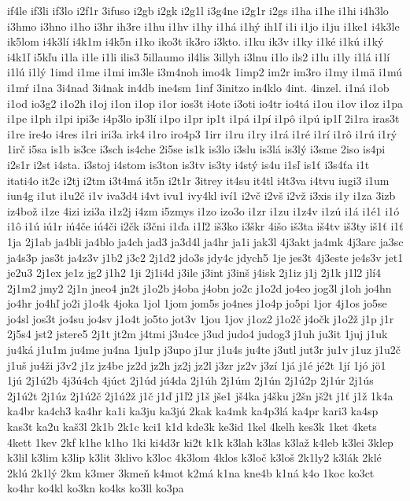 {if4le
if3li
if3lo
i2f1r
3ifuso
i2gb
i2gk
i2g1l
i3g4ne
i2g1r
i2gs
i1ha
i1he
i1hi
i4h3lo
i3hmo
i3hno
i1ho
i3hr
ih3re
i1hu
i1hv
i1hy
i1há
i1hý
ih1ľ
i1i
i1jo
i1ju
i1ke1
i4k3le
ik5lom
i4k3lí
i4k1m
i4k5n
i1ko
iko3t
ik3ro
i3kto.
i1ku
ik3v
i1ky
i1ké
i1kú
i1ký
i4k1ľ
i5kľu
i1la
i1le
i1li
ilis3
5illaumo
il4lis
3illyh
i3lnu
i1lo
ils2
i1lu
i1ly
i1lá
i1lí
i1lú
i1lý
1imd
i1me
i1mi
im3le
i3m4noh
imo4k
1imp2
im2r
im3ro
i1my
i1mä
i1mú
i1mŕ
i1na
3i4nad
3i4nak
in4db
ine4sm
1inf
3initzo
in4klo
4int.
4inzel.
i1ná
i1ob
i1od
io3g2
i1o2h
i1oj
i1on
i1op
i1or
ios3t
i4ote
i3oti
io4tr
io4tá
i1ou
i1ov
i1oz
i1pa
i1pe
i1ph
i1pi
ipi3e
i4p3lo
ip3lí
i1po
i1pr
ip1t
i1pá
i1pí
i1pô
i1pú
ip1ľ
2i1ra
iras3t
i1re
ire4o
i4res
i1ri
iri3a
irk4
i1ro
iro4p3
1irr
i1ru
i1ry
i1rá
i1ré
i1rí
i1rô
i1rú
i1rý
1irč
i5sa
is1b
is3ce
i3sch
is4che
2i5se
is1k
is3lo
i3slu
is3lá
is3lý
i3sme
2iso
is4pi
i2s1r
i2st
i4sta.
i3stoj
i4stom
is3ton
is3tv
is3ty
i4stý
is4u
i1sľ
is1ť
i3s4ťa
i1t
itati4o
it2c
i2tj
i2tm
i3t4má
it5n
i2t1r
3itrey
it4su
it4tl
i4t3va
i4tvu
iugi3
i1um
iun4g
i1ut
i1u2č
i1v
iva3d4
i4vt
ivu1
ivy4kl
iví1
i2vč
i2vš
i2vž
i3xis
i1y
i1za
3izb
iz4bož
i1ze
4izi
izi3a
i1z2j
i4zm
i5zmys
i1zo
izo3o
i1zr
i1zu
i1z4v
i1zú
i1á
i1é1
i1ó
i1ô
i1ú
iú1r
iú4če
iú4či
i2čk
i3čni
i1ďa
i1ľ2
iš3ko
i3škr
4išo
iš3ta
iš4tv
iš3ty
iš1ť
i1ť
1ja
2j1ab
ja4bli
ja4blo
ja4ch
jad3
ja3d4l
ja4hr
ja1i
jak3l
4j3akt
ja4mk
4j3arc
ja3sc
ja4s3p
jas3t
ja4z3v
j1b2
j3c2
2j1d2
jdo3s
jdy4c
jdych5
1je
jes3t
4j3este
je4s3v
jet1
je2u3
2j1ex
je1z
jg2
j1h2
1ji
2j1i4d
j3ile
j3int
j3inš
j4isk
2j1iz
j1j
2j1k
j1l2
jlí4
2j1m2
jmy2
2j1n
jneo4
jn2t
j1o2b
j4oba
j4obn
jo2c
j1o2d
jo4eo
jog3l
j1oh
jo4hn
jo4hr
jo4hľ
jo2i
j1o4k
4joka
1jol
1jom
jom5s
jo4nes
j1o4p
jo5pi
1jor
4j1os
jo5se
jo4sl
jos3t
jo4su
jo4sv
j1o4t
jo5to
jot3v
1jou
1jov
j1oz2
j1o2č
j4očk
j1o2ž
j1p
j1r
2j5s4
jst2
jstere5
2j1t
jt2m
j4tmi
j3u4ce
j3ud
judo4
judog3
j1uh
ju3it
1juj
j1uk
ju4ká
j1u1m
ju4me
ju4na
1ju1p
j3upo
j1ur
j1u4s
ju4te
j3utl
jut3r
ju1v
j1uz
j1u2č
j1uš
ju4ži
j3v2
j1z
jz4be
jz2d
jz2h
jz2j
jz2l
j3zr
jz2v
j3zí
1já
j1é
jé2t
1jí
1jó
jö1
1jú
2j1ú2b
4j3ú4ch
4júct
2j1úd
jú4da
2j1úh
2j1úm
2j1ún
2j1ú2p
2j1úr
2j1ús
2j1ú2t
2j1úz
2j1ú2č
2j1ú2ž
j1č
j1ď
j1ľ2
j1š
jše1
jš4ka
j4šku
j2šn
jš2t
j1ť
j1ž
1k4a
ka4br
ka4ch3
ka4hr
ka1i
ka3ju
ka3jú
2kak
ka4mk
ka4p3lá
ka4pr
kari3
ka4sp
kas3t
ka2u
kaš3l
2k1b
2k1c
kci1
k1d
kde3k
ke3id
1kel
4kelh
kes3k
1ket
4kets
4kett
1kev
2kf
k1he
k1ho
1ki
ki4d3r
ki2t
k1k
k3lah
k3las
k3laž
k4leb
k3lei
3klep
k3lil
k3lim
k3lip
k3lit
3klivo
k3loc
4k3lom
4klos
k3loč
k3loš
2k1ly2
k3lák
2klé
2klú
2k1lý
2km
k3mer
3kmeň
k4mot
k2má
k1na
kne4b
k1ná
k4o
1koc
ko3ct
ko4hr
ko4kl
ko3kn
ko4ks
ko3ll
ko3pa
}
